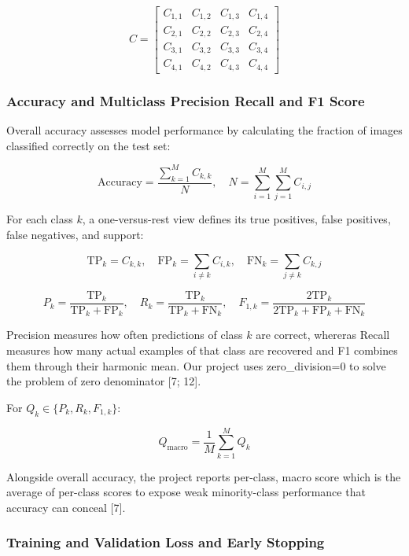 \[
C=\left[ \begin{matrix}{C}_{1,1} & {C}_{1,2} & {C}_{1,3} & {C}_{1,4} \\ {C}_{2,1} & {C}_{2,2} & {C}_{2,3} & {C}_{2,4} \\ {C}_{3,1} & {C}_{3,2} & {C}_{3,3} & {C}_{3,4} \\ {C}_{4,1} & {C}_{4,2} & {C}_{4,3} & {C}_{4,4}\end{matrix}\right] 
\]

\subsubsection{Accuracy and Multiclass Precision Recall and F1 Score}\label{theory:2.4.2}

Overall accuracy assesses model performance by calculating the fraction of images classified correctly on the test set:

\[
\mathrm{Accuracy}=\frac{\sum _{k=1}^{M} {C}_{k,k}}{N},\quad N=\sum _{i=1}^{M} \sum _{j=1}^{M} {C}_{i,j}
\]

For each class \(k\), a one-versus-rest view defines its true positives, false positives, false negatives, and support:

\[
{\mathrm{TP}}_{k}={C}_{k,k},\quad {\mathrm{FP}}_{k}=\sum _{i\ne k} {C}_{i,k},\quad {\mathrm{FN}}_{k}=\sum _{j\ne k} {C}_{k,j}
\]

\[
{P}_{k}=\frac{{\mathrm{TP}}_{k}}{{\mathrm{TP}}_{k}+{\mathrm{FP}}_{k}},\quad {R}_{k}=\frac{{\mathrm{TP}}_{k}}{{\mathrm{TP}}_{k}+{\mathrm{FN}}_{k}},\quad {F}_{1,k}=\frac{2{\mathrm{TP}}_{k}}{2{\mathrm{TP}}_{k}+{\mathrm{FP}}_{k}+{\mathrm{FN}}_{k}}
\]

Precision measures how often predictions of class \(k\) are correct, whereras Recall measures how many actual examples of that class are recovered and F1 combines them through their harmonic mean. Our project uses zero\_division=0 to solve the problem of zero denominator [7; 12].

For \({Q}_{k}\in \{{P}_{k},{R}_{k},{F}_{1,k}\}\):

\[
{Q}_{\mathrm{macro}}=\frac{1}{M}\sum _{k=1}^{M} {Q}_{k}
\]

Alongside overall accuracy, the project reports per-class, macro score which is the average of per-class scores to expose weak minority-class performance that accuracy can conceal [7].

\subsubsection{Training and Validation Loss and Early Stopping}\label{theory:2.4.3}

